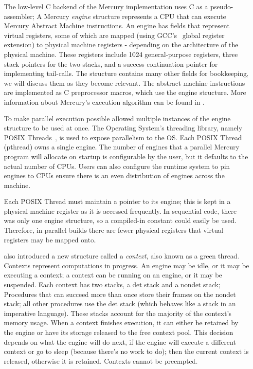 

The low-level C backend of the Mercury implementation uses C as a
pseudo-assembler;
A Mercury \emph{engine} structure represents a CPU that can execute Mercury
Abstract Machine instructions.
An engine has fields that represent virtual registers,
some of which are mapped (using GCC's~\citep{gcc} global register extension) to
physical machine registers - depending on the architecture of the physical
machine.
These registers include 1024 general-purpose registers,
three stack pointers for the two stacks,
and a success continuation pointer for implementing tail-calls.
The structure contains many other fields for bookkeeping,
we will discuss them as they become relevant.
The abstract machine instructions are implemented as C preprocessor macros,
which use the engine structure.
More information about Mercury's execution algorithm can be found in
\citet{mercury_jlp}.

To make parallel execution possible \citet{conway:2002:par} allowed
multiple instances of the engine structure to be used at once.
The Operating System's threading library,
namely POSIX Threads~\citep{butenhof1997:pthreads},
is used to expose parallelism to the OS.
Each POSIX Thread (pthread) owns a single engine.
The number of engines that a parallel Mercury program will allocate on startup
is configurable by the user,
but it defaults to the actual number of CPUs.
Users can also configure the runtime system to pin engines to CPUs
ensure there is an even distribution of engines across the machine.

Each POSIX Thread must maintain a pointer to its engine;
this is kept in a physical machine register as it is accessed
frequently.
In sequential code,
there was only one engine structure,
so a compiled-in constant could easily be used.
Therefore, in parallel builds there are fewer physical registers that
virtual registers may be mapped onto.

\citet{conway:2002:par} also introduced a new structure called a
\emph{context}, also known as a green thread.
Contexts represent computations in progress.
An engine may be idle, or it may be executing a context;
a context can be running on an engine, or it may be suspended.
Each context has two stacks, a det stack and a nondet stack;
Procedures that can succeed more than once
store their frames on the nondet stack;
all other procedures use the det stack
(which behaves like a stack in an imperative language).
These stacks account for the majority of the context's memory usage.
When a context finishes execution,
it can either be retained by the engine or have its storage released to the
free context pool.
This decision depends on what the engine will do next,
if the engine will execute a different context or go to sleep
(because there's no work to do);
then the current context is released,
otherwise it is retained.
Contexts cannot be preempted.

